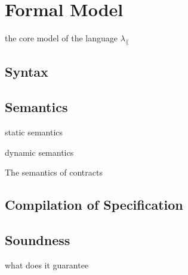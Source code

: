\section{Formal Model}
\label{sec:model}

the core model of the language $\lambda_\lang$

\subsection{Syntax}



\subsection{Semantics}

static semantics

dynamic semantics

The semantics of contracts 

\subsection{Compilation of Specification}

\subsection{Soundness}

what does it guarantee

